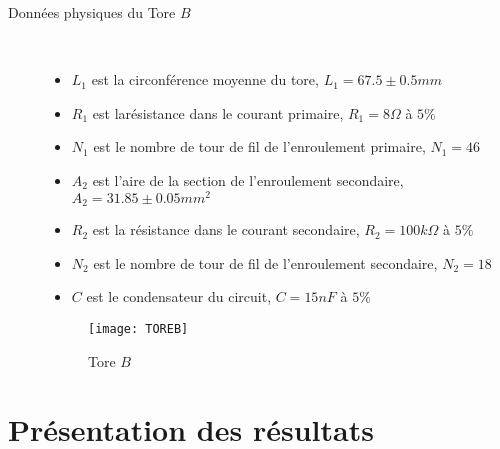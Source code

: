 \documentclass{article}
\begin{document}
\begin{description}
\item[Données physiques du Tore $B$]\hfill\\
\begin{itemize}
\item $L_1$ est la circonférence moyenne du tore, $L_1 = 67.5\pm 0.5 mm$
\item $R_1$ est larésistance dans le courant primaire, $R_1 = 8\Omega$ à $ 5\%$
\item $N_1$ est le nombre de tour de fil de l'enroulement primaire, $N_1 = 46$
\item $A_2$ est l'aire de la section de l'enroulement secondaire, $A_2 = 31.85\pm 0.05mm^{2}$
\item $R_2$ est la résistance dans le courant secondaire, $R_2 = 100k\Omega$ à $5\%$
\item $N_2$ est le nombre de tour de fil de l'enroulement secondaire, $N_2 = 18$
\item $C$ est le condensateur du circuit, $C = 15nF$ à $5\%$ 
\end{itemize}





\begin{figure}[h!]
\begin{center}
\texttt{[image: TOREB]}
\caption{Tore $B$}
\label{fig:montage4}
\end{center}
\end{figure}

\pagebreak


\end{description}

\section{Présentation des résultats}
\end{document}
